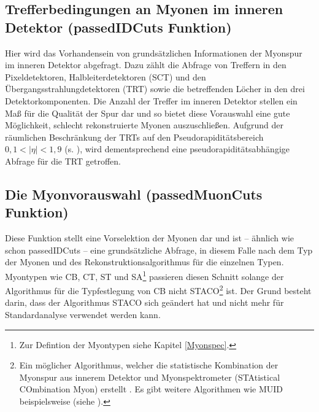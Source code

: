 \subsection{Trefferbedingungen an Myonen im inneren Detektor (passedIDCuts Funktion)}%
Hier wird das Vorhandensein von grundsätzlichen Informationen der Myonspur im inneren Detektor abgefragt. Dazu zählt die Abfrage von Treffern in den Pixeldetektoren, Halbleiterdetektoren (SCT) und den Übergangsstrahlungdetektoren (TRT) sowie die betreffenden Löcher in den drei Detektorkomponenten. Die Anzahl der Treffer im inneren Detektor stellen ein Maß für die Qualität der Spur dar und so bietet diese Vorauswahl eine gute Möglichkeit, schlecht rekonstruierte Myonen auszuschließen. Aufgrund der räumlichen Beschränkung der TRTs auf den Pseudorapiditätsbereich $0{,}1<|\eta|<1{,}9$ (s. \cite{ATLAS}), wird dementsprechend eine pseudorapiditätsabhängige Abfrage für die TRT getroffen.      
\subsection{Die Myonvorauswahl (passedMuonCuts Funktion)}%
Diese Funktion stellt eine Vorselektion der Myonen dar und ist -- ähnlich wie schon passedIDCuts -- eine grundsätzliche Abfrage, in diesem Falle nach dem Typ der Myonen und des Rekonstruktionsalgorithmus für die einzelnen Typen. Myontypen wie CB, CT, ST und SA\footnote{Zur Defintion der Myontypen siehe Kapitel \ref{Myonspec}.} passieren diesen Schnitt solange der Algorithmus für die Typfestlegung von CB nicht STACO\footnote{Ein möglicher Algorithmus, welcher die statistische Kombination der Myonspur aus innerem Detektor und Myonspektrometer (STAtistical COmbination Myon) erstellt \cite{twikiMuReco}. Es gibt weitere Algorithmen wie MUID beispielsweise (siehe \cite{twikiSTACO}).} ist. Der Grund besteht darin, dass der Algorithmus STACO sich geändert hat und nicht mehr für Standardanalyse verwendet werden kann.  
